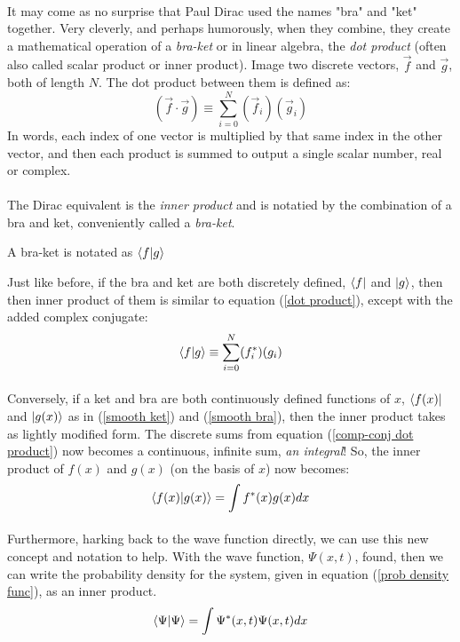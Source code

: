 \documentclass[12pt,letterpaper]{book}
\begin{document}
\paragraph*{}It may come as no surprise that Paul Dirac used the names "bra" and "ket" together. Very cleverly, and perhaps humorously, when they combine, they create a mathematical operation of a \textit{bra-ket} or in linear algebra, the \textit{dot product} (often also called scalar product or inner product). Image two discrete vectors, 
$\vec{f}$ and $\vec{g}$, both of length $N$. The dot product between them is defined as:
\begin{equation}
\label{dot product}
(\vec{f} \cdot \vec{g}) \equiv \sum_{i=0}^N (\vec{f}_i)(\vec{g}_i)
\end{equation}
In words, each index of one vector is multiplied by that same index in the other vector, and then each product is summed to output a single scalar number, real or complex.
\paragraph*{}The Dirac equivalent is the \textit{inner product} and is notatied by the combination of a bra and ket, conveniently called a \textit{bra-ket}.
\begin{center}
A bra-ket is notated as $\braket{f}{g}$
\end{center}
Just like before, if the bra and ket are both discretely defined, $\bra{f}$ and $\ket{g}$, then then inner product of them is similar to equation (\ref{dot product}), except with the added complex conjugate:
\begin{equation}
\label{comp-conj dot product}
\braket{f}{g} \equiv \sum_{i=0}^N (f^*_i) (g_i)
\end{equation}
\paragraph*{}Conversely, if a ket and bra are both continuously defined functions of $x$, $\bra{f(x)}$ and $\ket{g(x)}$ as in (\ref{smooth ket}) and (\ref{smooth bra}), then the inner product takes as lightly modified form. The discrete sums from equation (\ref{comp-conj dot product}) now becomes a continuous, infinite sum, \textit{an integral}! So, the inner product of $f(x)$ and $g(x)$ (on the basis of $x$) now becomes:
\begin{equation}
\label{bra-ket}
\braket{f(x)}{g(x)} = \int f^*(x) g(x) dx
\end{equation}
\paragraph*{}Furthermore, harking back to the wave function directly, we can use this new concept and notation to help. With the wave function, $\Psi(x,t)$, found, then we can write the probability density for the system, given in equation (\ref{prob density func}), as an inner product.
\begin{equation}
\label{inner prod integral}
\braket{\Psi}{\Psi} = \int \Psi^*(x,t) \Psi(x,t) dx
\end{equation}
\end{document}
